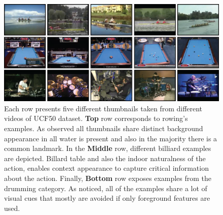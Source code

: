 \begin{figure}[t!]
\begin{center}
\includegraphics[width=0.98\linewidth]{fig/sift.png}
\end{center}
\caption{Each row presents five different thumbnails taken from different videos of UCF50 dataset. \textbf{Top} row corresponds to rowing's examples. As observed all thumbnails share distinct background appearance \ie in all water is present and also in the majority there is a common landmark. In the \textbf{Middle} row, different billiard examples are depicted. Billard table and also the indoor naturalness of the action, enables context appearance to capture critical information about the action. Finally, \textbf{Bottom} row exposes examples from the drumming category. As noticed, all of the examples share a lot of visual cues that mostly are avoided if only foreground features are used.}
\label{fig:sift_example}
\end{figure}